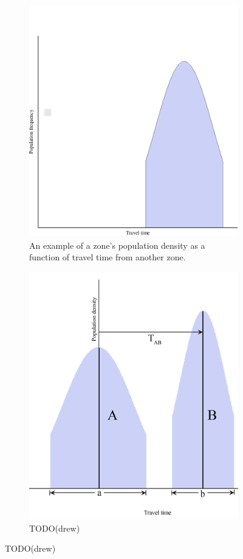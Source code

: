 \documentclass[notitlepage, 12pt]{article}
\begin{document}
\begin{figure}
\centering
\begin{subfigure}{.45\textwidth}
  \centering
  \includegraphics[width=0.9\linewidth]{B(t).png}
  \caption{An example of a zone's population density as a function of travel time from another zone.}
  \label{fig:sub1}
\end{subfigure}%
\hfill
\begin{subfigure}{.45\textwidth}
  \centering
  \includegraphics[width=0.9\linewidth]{A(t)B(t).png}
  \caption{TODO(drew)}
  \label{fig:sub2}
\end{subfigure}
\label{fig:test}
\end{figure}
\end{document}
